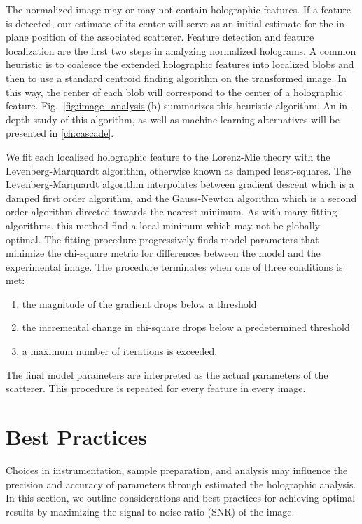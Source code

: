The normalized image may or may not contain holographic features. If a feature
is detected,
our estimate of its center will serve as an initial estimate
for the in-plane position of the associated scatterer.
Feature detection and feature localization are the first two steps in analyzing
normalized holograms. A common heuristic is to coalesce the
extended holographic features into localized blobs and then to use a standard
centroid finding algorithm\cite{crocker96} on the transformed image. In this way,
the center of each blob will correspond to the center of a holographic feature.
Fig.~\ref{fig:image_analysis}(b)
summarizes this heuristic algorithm. An in-depth study of this algorithm, as well
as machine-learning alternatives will be presented in \autoref{ch:cascade}.

We fit each localized holographic feature to the Lorenz-Mie theory
with the Levenberg-Marquardt algorithm, otherwise known as damped least-squares.
The Levenberg-Marquardt algorithm interpolates between gradient descent which is a damped
first order algorithm, and the Gauss-Newton algorithm which is a second order
algorithm directed towards the nearest minimum. As with many fitting algorithms,
this method find a local minimum which may not be globally optimal. The fitting
procedure progressively finds model parameters that minimize the
chi-square metric for differences between the model and the experimental image.
The procedure terminates when one of three conditions is met:
\begin{enumerate}
\item the magnitude of the gradient drops below a threshold
\item the incremental change in chi-square drops below a predetermined threshold
\item a maximum number of iterations is exceeded.
\end{enumerate}
The final model parameters are interpreted as the actual parameters of the
scatterer. This procedure is repeated for every feature in every image.

\section{Best Practices}

Choices in instrumentation, sample preparation, and analysis may influence
the precision and accuracy of parameters through estimated the holographic
analysis. In this section, we outline considerations
and best practices for achieving optimal results by maximizing the
signal-to-noise ratio (SNR) of the image.

